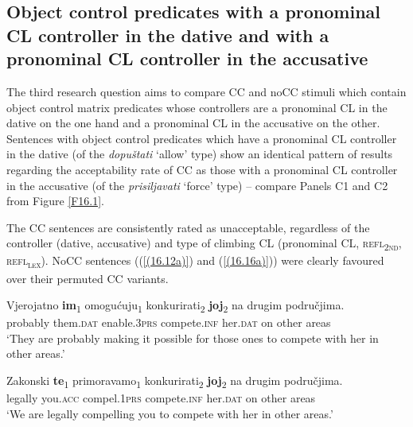 \subsection{Object control predicates with a pronominal CL controller in the dative and with a pronominal CL controller in the accusative}
\label{Object control predicates with a pronominal CL controller in the dative and with a pronominal CL controller in the accusative}
The third research question aims to compare CC and noCC stimuli which contain object control matrix predicates whose controllers are a pronominal CL in the dative on the one hand and a pronominal CL in the accusative on the other. Sentences with object control predicates which have a pronominal CL controller in the dative (of the \textit{dopuštati} ‘allow’ type) show an identical pattern of results regarding the acceptability rate of CC as those with a pronominal CL controller in the accusative (of the \textit{prisiljavati} ‘force’ type) – compare Panels C1 and C2 from Figure \ref{F16.1}.



The CC sentences are consistently rated as unacceptable, regardless of the controller (dative, accusative) and type of climbing CL (pronominal CL, \textsc{refl\textsubscript{2nd}}, \textsc{refl\textsubscript{\textsc{lex}}}). NoCC sentences ((\ref{(16.12a)}) and (\ref{(16.16a)})) were clearly favoured over their permuted CC variants. 

\begin{exe}
\gll Vjerojatno \textbf{im}\textsubscript{1} omogućuju\textsubscript{1} konkurirati\textsubscript{2} \textbf{joj}\textsubscript{2} na drugim područjima.\\
 probably them.\textsc{dat} enable.3\textsc{prs} compete.\textsc{inf} her.\textsc{dat} on other areas\\
\glt ‘They are probably making it possible for those ones to compete with her in other areas.’

\ex\label{(16.16a)}
\gll Zakonski \textbf{te}\textsubscript{1} primoravamo\textsubscript{1} konkurirati\textsubscript{2} \textbf{joj}\textsubscript{2} na drugim područjima.\\
 legally you.\textsc{acc} compel.1\textsc{prs} compete.\textsc{inf} her.\textsc{dat} on other areas\\
\glt ‘We are legally compelling you to compete with her in other areas.’ 
\end{exe}
 
